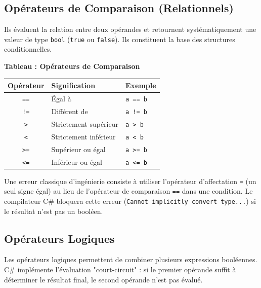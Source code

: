 \subsection{Opérateurs de Comparaison (Relationnels)}

Ils évaluent la relation entre deux opérandes et retournent systématiquement une valeur de type \texttt{bool} (\texttt{true} ou \texttt{false}). Ils constituent la base des structures conditionnelles.

\begin{center}
    \textbf{Tableau : Opérateurs de Comparaison} \\[0.3cm]
    \begin{tabular}{@{}cll@{}}
        \toprule
        \textbf{Opérateur} & \textbf{Signification} & \textbf{Exemple} \\
        \midrule
        \texttt{==} & Égal à & \texttt{a == b} \\
        \texttt{!=} & Différent de & \texttt{a != b} \\
        \texttt{>} & Strictement supérieur & \texttt{a > b} \\
        \texttt{<} & Strictement inférieur & \texttt{a < b} \\
        \texttt{>=} & Supérieur ou égal & \texttt{a >= b} \\
        \texttt{<=} & Inférieur ou égal & \texttt{a <= b} \\
        \bottomrule
    \end{tabular}
\end{center}

\begin{tcolorbox}[colback=backcolour,colframe=keywordcolor,title=\textbf{Erreur Courante : Affectation vs Égalité}]
    Une erreur classique d'ingénierie consiste à utiliser l'opérateur d'affectation \texttt{=} (un seul signe égal) au lieu de l'opérateur de comparaison \texttt{==} dans une condition. Le compilateur C\# bloquera cette erreur (\texttt{Cannot implicitly convert type...}) si le résultat n'est pas un booléen.
\end{tcolorbox}

\subsection{Opérateurs Logiques}

Les opérateurs logiques permettent de combiner plusieurs expressions booléennes. C\# implémente l'évaluation "court-circuit" : si le premier opérande suffit à déterminer le résultat final, le second opérande n'est pas évalué.

